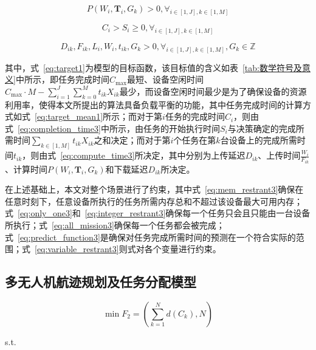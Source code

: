 \begin{equation}
    P(W_i, \mathbf{T}_i, G_k) > 0, \forall_{i \in [1, J], k \in [1, M]} \label{eq:predict_function3}
\end{equation}

\begin{equation}
    C_{i} > S_{i} \ge 0, \forall_{i \in [1, J], k \in [1, M]} \label{eq:time_restrant3}
\end{equation}

\begin{equation}
    D_{ik}, F_{ik}, L_{i}, W_{i}, t_{ik}, G_{k} > 0, \forall_{i \in [1, J], k \in [1, M]}, G_{k} \in \mathbb{Z} \label{eq:variable_restrant3}
\end{equation}

其中，式~\ref{eq:target1}为模型的目标函数，该目标值的含义如表~\ref{tab:数学符号及意义}中所示，即任务完成时间\( C_{\text{max}} \)最短、设备空闲时间\( C_{\text{max}} \cdot M - \sum^J_{i = 1} \sum^M_{k = 0} t_{ik} X_{i k} \)最少，而设备空闲时间最少是为了确保设备的资源利用率，使得本文所提出的算法具备负载平衡的功能，其中任务完成时间的计算方式如式~\ref{eq:target_mean1}所示；而对于第\( i \)任务的完成时间\( C_{i} \)，则由式~\ref{eq:completion_time3}中所示，由任务的开始执行时间\( S_{i} \)与决策确定的完成所需时间\( \sum_{k \in [1, M]} t_{ik} X_{ik} \)之和决定；而对于第\( i \)个任务在第\( k \)台设备上的完成所需时间\( t_{ik} \)，则由式~\ref{eq:compute_time3}所决定，其中分别为上传延迟\( D_{i k} \)、上传时间\( \frac{W_i}{F_{i k}} \)、计算时间\( P(W_i, \mathbf{T}_i, G_k) \)和下载延迟\( D_{i k} \)所决定。

在上述基础上，本文对整个场景进行了约束，其中式~\ref{eq:mem_restrant3}确保在任意时刻下，任意设备所执行的任务所需内存总和不超过该设备最大可用内存；式~\ref{eq:only_one3}和~\ref{eq:integer_restrant3}确保每一个任务只会且只能由一台设备所执行；式~\ref{eq:all_mission3}确保每一个任务都会被完成；式~\ref{eq:predict_function3}是确保对任务完成所需时间的预测在一个符合实际的范围；式~\ref{eq:variable_restrant3}则式对各个变量进行约束。

\subsection{多无人机航迹规划及任务分配模型} \label{sec:assignment_model}

\begin{equation}
    \min F_2 = (\sum^N_{k=1} d(C_k), N)  \label{eq:target2}
\end{equation}

s.t.

